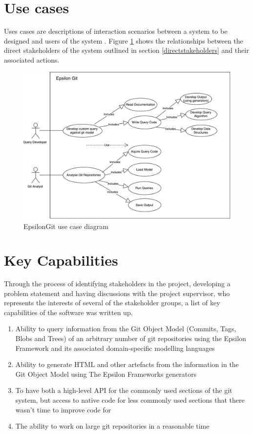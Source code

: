 \documentclass[11pt]{book}
\begin{document}
\section{Use cases}
Uses cases are descriptions of interaction scenarios between a system to be designed and users of the system \cite{usecase}. Figure \ref{fig:usecasediagram} shows the relationships between the direct stakeholders of the system outlined in section \ref{directstakeholders} and their associated actions.

\begin{figure}[h]
	\centering
	\includegraphics[width=\textwidth]{images/use-case-diagram}
	\caption{EpsilonGit use case diagram}
	\label{fig:usecasediagram}
\end{figure}

\section{Key Capabilities}
\label{keycapabilities}
Through the process of identifying stakeholders in the project, developing a problem statement and having discussions with the project supervisor, who represents the interests of several of the stakeholder groups, a list of key capabilities of the software was written up.

\begin{enumerate}
	\item Ability to query information from the Git Object Model (Commits, Tags, Blobs and Trees) of an arbitrary number of git repositories using the Epsilon Framework and its associated domain-specific modelling languages
	\item Ability to generate HTML and other artefacts from the information in the Git Object Model using The Epsilon Frameworks generators
	\item To have both a high-level API for the commonly used sections of the git system, but access to native code for less commonly used sections that there wasn't time to improve code for
	\item The ability to work on large git repositories in a reasonable time
\end{enumerate} 
\end{document}
